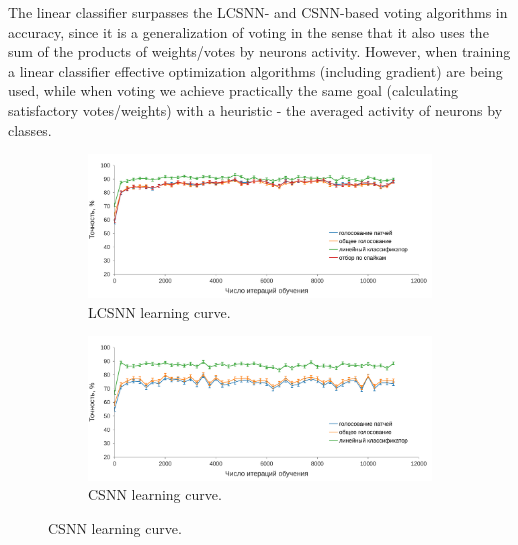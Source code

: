 \documentclass[a4paper]{article}
\begin{document}
The linear classifier surpasses the LCSNN- and CSNN-based voting algorithms in accuracy, since it is a generalization of voting in the sense that it also uses the sum of the products of weights/votes by neurons activity. However, when training a linear classifier effective optimization algorithms (including gradient) are being used, while when voting we achieve practically the same goal (calculating satisfactory votes/weights) with a heuristic - the averaged activity of neurons by classes.

\begin{figure}
\centering
\begin{subfigure}{0.48\textwidth}
    \includegraphics[width=\textwidth,keepaspectratio=true]{LCSNN_learning_rate_ru.pdf}
 \caption{LCSNN learning curve.}
 \label{LCSNN_learning_curve}
\end{subfigure} 
\begin{subfigure}{0.48\textwidth} 
    \includegraphics[width=\textwidth,keepaspectratio=true]{CSNN_learning_rate_ru.pdf}
 \caption{CSNN learning curve.}
 \label{CSNN_learning_curve}
\end{subfigure} 
\end{figure}
\end{document}
